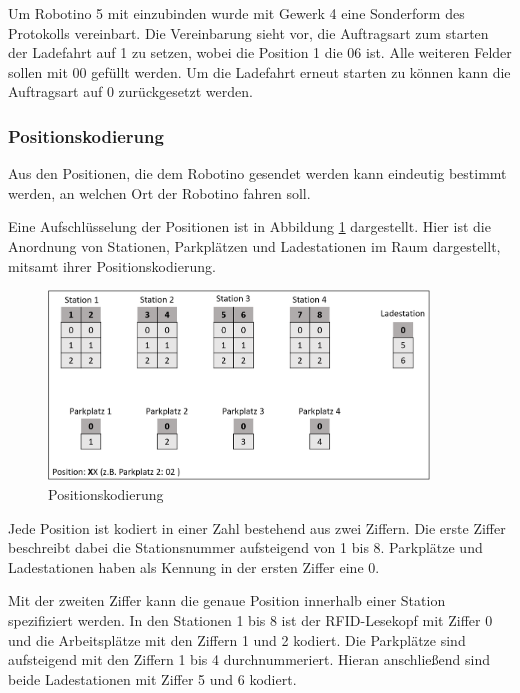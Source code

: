 Um Robotino 5 mit einzubinden wurde mit Gewerk 4 eine Sonderform des Protokolls vereinbart. Die Vereinbarung sieht vor, die Auftragsart zum starten der Ladefahrt auf 1 zu setzen, wobei die Position 1 die 06 ist. Alle weiteren Felder sollen mit 00 gefüllt werden. Um die Ladefahrt erneut starten zu können kann die Auftragsart auf 0 zurückgesetzt werden. 

\subsubsection{Positionskodierung}
\label{sec:Positionskodierung}

Aus den Positionen, die dem Robotino gesendet werden kann eindeutig bestimmt werden, an welchen Ort der Robotino fahren soll. 

Eine Aufschlüsselung der Positionen ist in Abbildung \ref{fig:Positionskodierung} dargestellt. Hier ist die Anordnung von Stationen, Parkplätzen und Ladestationen im Raum dargestellt, mitsamt ihrer Positionskodierung. 

\begin{figure}[htb]
    \centering
    \includegraphics[width=0.9\textwidth]{Abbildungen/Positionskodierung.PNG}
    \caption{Positionskodierung}		
    \label{fig:Positionskodierung}
\end{figure}

Jede Position ist kodiert in einer Zahl bestehend aus zwei Ziffern. Die erste Ziffer beschreibt dabei die Stationsnummer aufsteigend von 1 bis 8. Parkplätze und Ladestationen haben als Kennung in der ersten Ziffer eine 0. 

Mit der zweiten Ziffer kann die genaue Position innerhalb einer Station spezifiziert werden. In den Stationen 1 bis 8 ist der RFID-Lesekopf mit Ziffer 0 und die Arbeitsplätze mit den Ziffern 1 und 2 kodiert. Die Parkplätze sind aufsteigend mit den Ziffern 1 bis 4 durchnummeriert. Hieran anschließend sind beide Ladestationen mit Ziffer 5 und 6 kodiert. 

